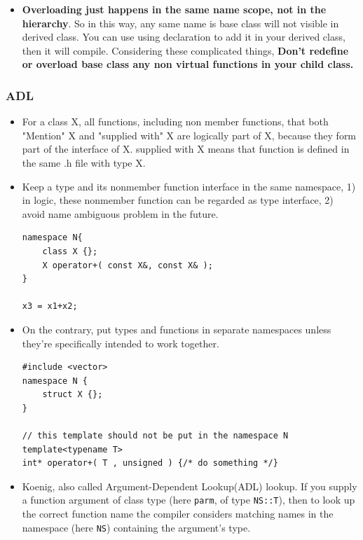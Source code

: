 \documentclass[a4paper,11pt,twoside]{book}
\begin{document}
\begin{itemize}
\begin{enumerate}
	\end{enumerate}

	\item  \textbf{Overloading just happens in the same name scope, not in the hierarchy}. So in this way, any same name is base class will not visible in derived class. You can use using declaration to add it in your derived class, then it will compile. Considering these complicated things, \textbf{Don't redefine or overload base class any non virtual functions in your child class.}

\end{itemize}

\subsubsection{ADL}
\begin{itemize}
	\item For a class X, all functions, including non member functions, that both "Mention" X and "supplied with" X are logically part of X, because they form part of the interface of X. supplied with X means that function is defined in the same .h file with type X. 
	
	\item Keep a type and its nonmember function interface in the same namespace, 1) in logic, these nonmember function can be regarded as type interface, 2) avoid name ambiguous problem in the future.
\begin{lstlisting}[numbers=none]
namespace N{
	class X {};
	X operator+( const X&, const X& );
}

x3 = x1+x2;	
\end{lstlisting}	
	
	\item On the contrary, put types and functions in separate namespaces unless they're specifically intended to work together.
	
\begin{lstlisting}[numbers=none]
#include <vector>
namespace N {
	struct X {};
}

// this template should not be put in the namespace N
template<typename T>
int* operator+( T , unsigned ) {/* do something */}	
\end{lstlisting}	
	
	
	\item Koenig, also called Argument-Dependent Lookup(ADL) lookup. If you supply a function argument of class type (here \texttt{parm}, of type \texttt{NS::T}), then to look up the correct function name the compiler considers matching names in the namespace (here \texttt{NS}) containing the argument's type.
	

\end{itemize}
\end{document}
